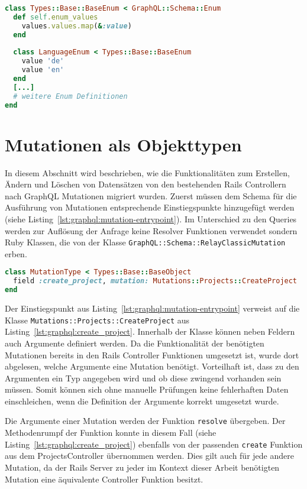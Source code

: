 \begin{lstlisting}[language=Ruby,float=h!,caption={Funktion zum Extrahieren der Enum Werte in ein Array. \lstinline|/graphql/types/base/base_enum.rb|}, label={lst:graphql:enum_values}]
class Types::Base::BaseEnum < GraphQL::Schema::Enum
  def self.enum_values
    values.values.map(&:value)
  end
  
  class LanguageEnum < Types::Base::BaseEnum
    value 'de'
    value 'en'
  end
  [...]
  # weitere Enum Definitionen
end
\end{lstlisting}

\section{Mutationen als Objekttypen}
In diesem Abschnitt wird beschrieben, wie die Funktionalitäten zum Erstellen, Ändern und Löschen von Datensätzen von den bestehenden Rails Controllern nach GraphQL Mutationen migriert wurden.
Zuerst müssen dem Schema für die Ausführung von Mutationen entsprechende Einstiegspunkte hinzugefügt werden (siehe Listing~\ref{lst:graphql:mutation-entrypoint}). Im Unterschied zu den Queries werden zur Auflösung der Anfrage keine Resolver Funktionen verwendet sondern Ruby Klassen, die von der Klasse \texttt{GraphQL::Schema::RelayClassic\-Mutation} erben. 

\begin{lstlisting}[language=Ruby,float=h!,caption={Definition eines Endpunktes zum Aufruf der Mutation für Erstellung eines Projektes \lstinline|/graphql/types/mutation_type.rb|}, label={lst:graphql:mutation-entrypoint}]
class MutationType < Types::Base::BaseObject
  field :create_project, mutation: Mutations::Projects::CreateProject
end
\end{lstlisting}

Der Einstiegspunkt aus Listing~\ref{lst:graphql:mutation-entrypoint} verweist auf die Klasse \texttt{Mutations::Projects::\-Create\-Project} aus Listing~\ref{lst:graphql:create_project}. Innerhalb der Klasse können neben Feldern auch Argumente definiert werden. Da die Funktionalität der benötigten Mutationen bereits in den Rails Controller Funktionen umgesetzt ist, wurde dort abgelesen, welche Argumente eine Mutation benötigt. 
Vorteilhaft ist, dass zu den Argumenten ein Typ angegeben wird und ob diese zwingend vorhanden sein müssen. Somit können sich ohne manuelle Prüfungen keine fehlerhaften Daten einschleichen, wenn die Definition der Argumente korrekt umgesetzt wurde.

Die Argumente einer Mutation werden der Funktion \texttt{resolve} übergeben. Der Methodenrumpf der Funktion konnte in diesem Fall (siehe Listing~\ref{lst:graphql:create_project}) ebenfalls von der passenden \texttt{create} Funktion aus dem ProjectsController übernommen werden. Dies gilt auch für jede andere Mutation, da der Rails Server zu jeder im Kontext dieser Arbeit benötigten Mutation eine äquivalente Controller Funktion besitzt.

